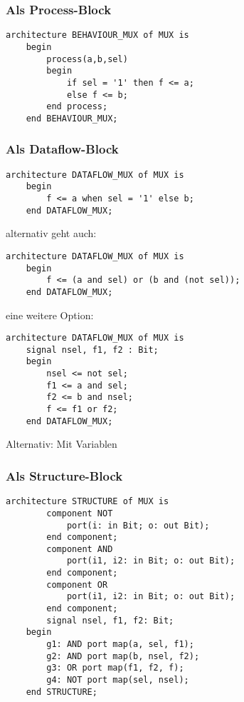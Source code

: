 \subsubsection{Als Process-Block}
\begin{lstlisting}[style=vhdl]
    architecture BEHAVIOUR_MUX of MUX is
    begin
        process(a,b,sel)
        begin
            if sel = '1' then f <= a;
            else f <= b;
        end process;
    end BEHAVIOUR_MUX;
\end{lstlisting}

\subsubsection{Als Dataflow-Block}
\begin{lstlisting}[style=vhdl]
    architecture DATAFLOW_MUX of MUX is
    begin
        f <= a when sel = '1' else b;
    end DATAFLOW_MUX;
\end{lstlisting}
alternativ geht auch:
\begin{lstlisting}[style=vhdl]
    architecture DATAFLOW_MUX of MUX is
    begin
        f <= (a and sel) or (b and (not sel));
    end DATAFLOW_MUX;
\end{lstlisting}

eine weitere Option:
\begin{lstlisting}[style=vhdl]
    architecture DATAFLOW_MUX of MUX is
    signal nsel, f1, f2 : Bit;
    begin
        nsel <= not sel;
        f1 <= a and sel;
        f2 <= b and nsel;
        f <= f1 or f2;
    end DATAFLOW_MUX;
\end{lstlisting}
Alternativ: Mit Variablen

\subsubsection{Als Structure-Block}
\begin{lstlisting}[style=vhdl]
    architecture STRUCTURE of MUX is
        component NOT
            port(i: in Bit; o: out Bit);
        end component;
        component AND
            port(i1, i2: in Bit; o: out Bit);
        end component;
        component OR
            port(i1, i2: in Bit; o: out Bit);
        end component;
        signal nsel, f1, f2: Bit;
    begin
        g1: AND port map(a, sel, f1);
        g2: AND port map(b, nsel, f2);
        g3: OR port map(f1, f2, f);
        g4: NOT port map(sel, nsel);
    end STRUCTURE;
\end{lstlisting}

